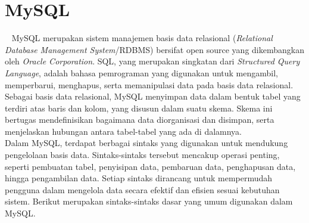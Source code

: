 \section{MySQL}
\label{sec:mysql}
~\cite{oracle:24:mysql8.4}
MySQL merupakan sistem manajemen basis data relasional (\textit{Relational Database Management System}/RDBMS) bersifat open source yang dikembangkan oleh \textit{Oracle Corporation}. SQL, yang merupakan singkatan dari \textit{Structured Query Language}, adalah bahasa pemrograman yang digunakan untuk mengambil, memperbarui, menghapus, serta memanipulasi data pada basis data relasional.
\\
Sebagai basis data relasional, MySQL menyimpan data dalam bentuk tabel yang terdiri atas baris dan kolom, yang disusun dalam suatu skema. Skema ini bertugas mendefinisikan bagaimana data diorganisasi dan disimpan, serta menjelaskan hubungan antara tabel-tabel yang ada di dalamnya.
\\
Dalam MySQL, terdapat berbagai sintaks yang digunakan untuk mendukung pengelolaan basis data. Sintaks-sintaks tersebut mencakup operasi penting, seperti pembuatan tabel, penyisipan data, pembaruan data, penghapusan data, hingga pengambilan data. Setiap sintaks dirancang untuk mempermudah pengguna dalam mengelola data secara efektif dan efisien sesuai kebutuhan sistem. Berikut merupakan sintaks-sintaks dasar yang umum digunakan dalam MySQL.
